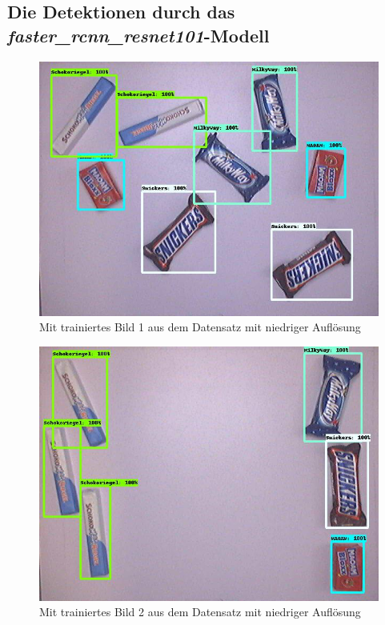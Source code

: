     \subsection{Die Detektionen durch das \textit{faster\_rcnn\_resnet101}-Modell}
    
    \begin{figure}[H]
        \vspace{-5mm}
        \centering
        \includegraphics[angle = 90, height = 0.85\textheight]{Bilder/models/model_comparison/faster_rcnn_resnet101_v1_640x640_coco17_tpu-8/trained_1.jpg}
        \caption{Mit trainiertes Bild 1 aus dem Datensatz mit niedriger Auflösung}
    \end{figure}
    
    \begin{figure}[H]
        \centering
        \includegraphics[angle = 90, width = \textwidth]{Bilder/models/model_comparison/faster_rcnn_resnet101_v1_640x640_coco17_tpu-8/trained_2.jpg}
        \caption{Mit trainiertes Bild 2 aus dem Datensatz mit niedriger Auflösung}
    \end{figure}
    
